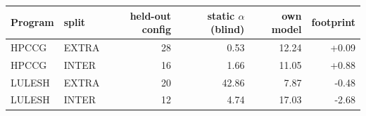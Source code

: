 \begin{tabular}{llrrrr}
\toprule
Program & split & held-out config & static $\alpha$ (blind) & own model & footprint \\
\midrule
HPCCG & EXTRA & 28 & 0.53 & 12.24 & +0.09 \\
HPCCG & INTER & 16 & 1.66 & 11.05 & +0.88 \\
LULESH & EXTRA & 20 & 42.86 & 7.87 & -0.48 \\
LULESH & INTER & 12 & 4.74 & 17.03 & -2.68 \\
\bottomrule
\end{tabular}
